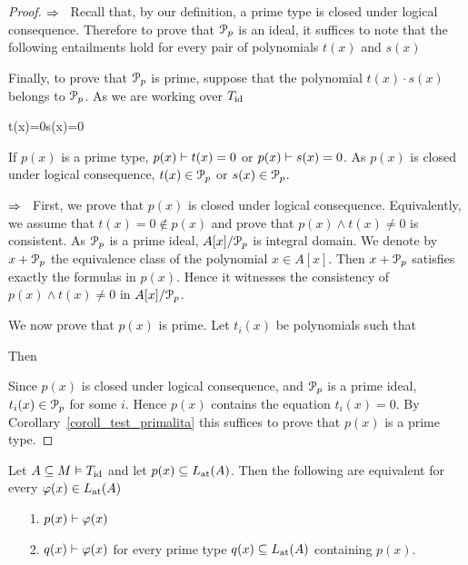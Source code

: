 \begin{proof}
  $\IMP$ \ Recall that, by our definition, a prime type is closed under logical consequence. 
  Therefore to prove that $\P_p$ is an ideal, it suffices to note that the following entailments hold for every pair of polynomials $t(x)$ and $s(x)$



  Finally, to prove that $\P_p$ is prime, suppose that the polynomial $t(x)\cdot s(x)$ belongs to $\P_p$.
  As we are working over $T_{\rm id}$
  
  {\proves}
  {t(x)=0\vee s(x)=0}
  
  If $p(x)$ is a prime type, $p(x)\proves t(x)=0$ or $p(x)\proves s(x)=0$.
  As $p(x)$ is closed under logical consequence, $t(x)\in\P_p$ or $s(x)\in\P_p$.

  $\IMP$ \ First, we prove that $p(x)$ is closed under logical consequence.
  Equivalently, we assume that $t(x)=0\notin p(x)$ and prove that $p(x)\wedge t(x)\neq0$ is consistent.
  As $\P_p$ is a prime ideal, $A[x]/\P_p$ is integral domain.
  We denote by $x+\P_p$ the equivalence class of the polynomial $x\in A[x]$.
  Then  $x+\P_p$ satisfies exactly the formulas in $p(x)$. 
  Hence it witnesses the consistency of $p(x)\wedge t(x)\neq0$ in $A[x]/\P_p$.

  We now prove that $p(x)$ is prime.
  Let $t_i(x)$ be polynomials such that


  Then


  Since $p(x)$ is closed under logical consequence, and $\P_p$ is a prime ideal, $t_i(x)\in\P_p$ for some $i$.
  Hence $p(x)$ contains the equation $t_i(x)=0$.
  By Corollary~\ref{coroll_test_primalita} this suffices to prove that $p(x)$ is a prime type.
\end{proof}

\begin{proposition}\label{prop_chiusura-radicale}
  Let $A\subseteq M\models T_{\rm id}$ and let $p(x)\subseteq\atL(A)$. 
  Then the following are equivalent for every $\phi(x)\in\atL(A)$
  \begin{itemize}
    \item[1.] $p(x)\proves\phi(x)$
    \item[2.] $q(x)\proves\phi(x)$ for every prime type $q(x)\subseteq\atL(A)$ containing $p(x)$.
  \end{itemize} 
\end{proposition}

